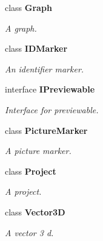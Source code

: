 \begin{DoxyCompactItemize}
class {\bf Graph}
\begin{DoxyCompactList}\small\item\em A graph. \end{DoxyCompactList}\item 
class {\bf I\-D\-Marker}
\begin{DoxyCompactList}\small\item\em An identifier marker. \end{DoxyCompactList}\item 
interface {\bf I\-Previewable}
\begin{DoxyCompactList}\small\item\em Interface for previewable. \end{DoxyCompactList}\item 
class {\bf Picture\-Marker}
\begin{DoxyCompactList}\small\item\em A picture marker. \end{DoxyCompactList}\item 
class {\bf Project}
\begin{DoxyCompactList}\small\item\em A project. \end{DoxyCompactList}\item 
class {\bf Vector3\-D}
\begin{DoxyCompactList}\small\item\em A vector 3 d. \end{DoxyCompactList}\end{DoxyCompactItemize}

